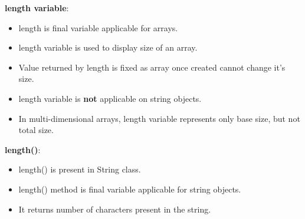 \setlength{\columnsep}{3pt}
\begin{flushleft}
	
	\textbf{length variable}:
	\begin{itemize}
		\item length is final variable applicable for arrays.
		\item length variable is used to display size of an array.
		\item Value returned by length is fixed as array once created cannot change it's size.
		\bigskip
		\bigskip
		
		\item length variable is \textbf{not} applicable on string objects.
		\bigskip
		
		\item In multi-dimensional arrays, length variable represents only base size, but not total size.
		\bigskip
		
	\end{itemize}
	
	\textbf{length()}:
	\begin{itemize}
		\item length() is present in String class.
		\item length() method is final variable applicable for string objects.
		\item It returns number of characters present in the string.
		\bigskip
		\bigskip
		\bigskip
		

\end{itemize}
\end{flushleft}
